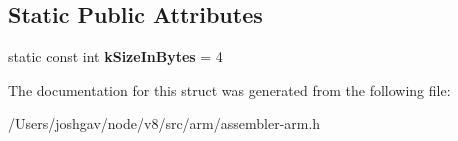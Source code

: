 \subsection*{Static Public Attributes}
\begin{DoxyCompactItemize}
\item 
static const int {\bfseries k\+Size\+In\+Bytes} = 4\hypertarget{structv8_1_1internal_1_1_sw_vfp_register_a3dedd48cee9fd300b37c61083a4f4636}{}\label{structv8_1_1internal_1_1_sw_vfp_register_a3dedd48cee9fd300b37c61083a4f4636}

\end{DoxyCompactItemize}


The documentation for this struct was generated from the following file\+:\begin{DoxyCompactItemize}
\item 
/\+Users/joshgav/node/v8/src/arm/assembler-\/arm.\+h\end{DoxyCompactItemize}
